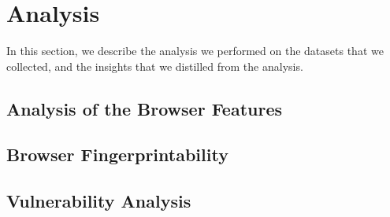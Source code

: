 \section{Analysis}
\label{sec:analysis}

In this section, we describe the analysis we performed on the datasets
that we collected, and the insights that we distilled from the
analysis.

\subsection{Analysis of the Browser Features}



\subsection{Browser Fingerprintability}



\subsection{Vulnerability Analysis}

